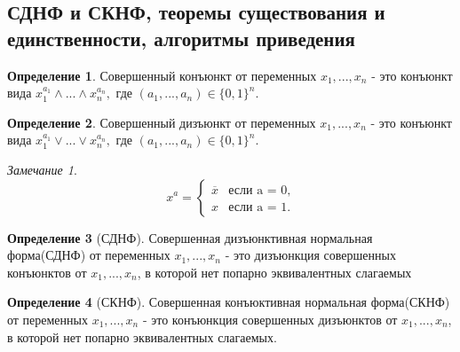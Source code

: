 \documentclass[a4paper]{article}
\theoremstyle{definition}
\newtheorem*{definition}{Определение}
\theoremstyle{remark}
\newtheorem*{remark}{Замечание}
\begin{document}
    \subsection{СДНФ и СКНФ, теоремы существования и единственности, алгоритмы приведения}
	\begin{definition}
		Совершенный конъюнкт от переменных $x_1, ..., x_n$ - это конъюнкт вида $x_1^{a_1} \wedge...\wedge x_n^{a_n},$ где $(a_1, ..., a_n) \in \{0, 1\}^n.$
	\end{definition}
	\begin{definition}
		Совершенный дизъюнкт от переменных $x_1, ..., x_n$ - это конъюнкт вида $x_1^{a_1} \vee...\vee x_n^{a_n},$ где $(a_1, ..., a_n) \in \{0, 1\}^n.$
	\end{definition}
	\begin{remark}
		\begin{equation*}
			x^a = 
 			\begin{cases}
   				\overline{x} &\text{если a = 0,}\\
   				x &\text{если a = 1.}
 			\end{cases}
		\end{equation*}
	\end{remark}
	\begin{definition}[СДНФ]
		Совершенная дизъюнктивная нормальная форма(СДНФ) от переменных $x_1, ..., x_n$  - это дизъюнкция совершенных конъюнктов от $x_1, ..., x_n$, в которой нет попарно эквивалентных слагаемых
	\end{definition}
	\begin{definition}[СКНФ]
		Совершенная конъюктивная нормальная форма(СКНФ) от переменных $x_1, ..., x_n$ - это конъюнкция совершенных дизъюнктов от $x_1, ..., x_n$, в которой нет попарно эквивалентных слагаемых.
	\end{definition}
\end{document}
